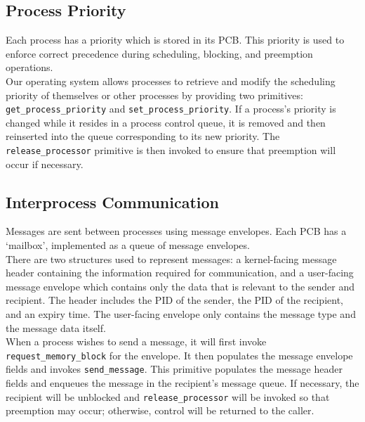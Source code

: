 \documentclass[12pt]{report}
\begin{document}
\subsection{Process Priority}

Each process has a priority which is stored in its PCB. This priority is used to enforce correct precedence during scheduling, blocking, and preemption operations.\\

Our operating system allows processes to retrieve and modify the scheduling priority of themselves or other processes by providing two primitives: \texttt{get_process_priority} and \texttt{set_process_priority}. If a process's priority is changed while it resides in a process control queue, it is removed and then reinserted into the queue corresponding to its new priority. The \texttt{release_processor} primitive is then invoked to ensure that preemption will occur if necessary.

\subsection{Interprocess Communication}

Messages are sent between processes using message envelopes. Each PCB has a `mailbox', implemented as a queue of message envelopes.\\

There are two structures used to represent messages: a kernel-facing message header containing the information required for communication, and a user-facing message envelope which contains only the data that is relevant to the sender and recipient. The header includes the PID of the sender, the PID of the recipient, and an expiry time. The user-facing envelope only contains the message type and the message data itself.\\

When a process wishes to send a message, it will first invoke \texttt{request_memory_block} for the envelope. It then populates the message envelope fields and invokes \texttt{send_message}. This primitive populates the message header fields and enqueues the message in the recipient's message queue. If necessary, the recipient will be unblocked and \texttt{release_processor} will be invoked so that preemption may occur; otherwise, control will be returned to the caller.\\
\end{document}
